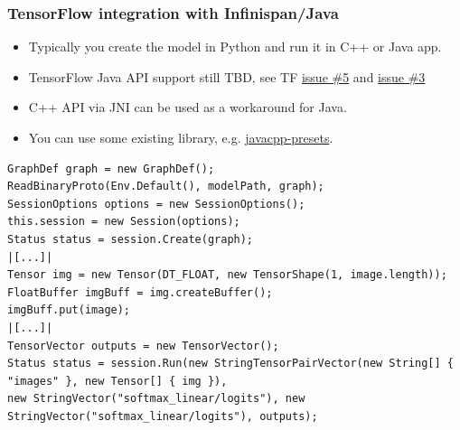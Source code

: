 \documentclass[10pt,utf8]{beamer}
\begin{document}
\begin{frame}[fragile]
	\frametitle{TensorFlow integration with Infinispan/Java}
	\vspace{-0.1cm}
	\begin{itemize}
		\item Typically you create the model in Python and run it in C++ or Java app.
		\item TensorFlow Java API support still TBD, see TF \color{blue}\href{https://github.com/tensorflow/tensorflow/issues/5}{issue \#5}\color{black} and \color{blue}\href{https://github.com/tensorflow/tensorflow/issues/3}{issue \#3}\color{black}
		\item C++ API via JNI can be used as a workaround for Java.
		\item You can use some existing library, e.g. \color{blue}\href{https://github.com/bytedeco/javacpp-presets}{javacpp-presets}\color{black}.
	\end{itemize}
	\begin{lstlisting}[style=Java]
GraphDef graph = new GraphDef();
ReadBinaryProto(Env.Default(), modelPath, graph);
SessionOptions options = new SessionOptions();
this.session = new Session(options);
Status status = session.Create(graph);
|[...]|
Tensor img = new Tensor(DT_FLOAT, new TensorShape(1, image.length));
FloatBuffer imgBuff = img.createBuffer();
imgBuff.put(image);
|[...]|
TensorVector outputs = new TensorVector();
Status status = session.Run(new StringTensorPairVector(new String[] { "images" }, new Tensor[] { img }),
new StringVector("softmax_linear/logits"), new StringVector("softmax_linear/logits"), outputs);
	\end{lstlisting}
\end{frame}
\end{document}
